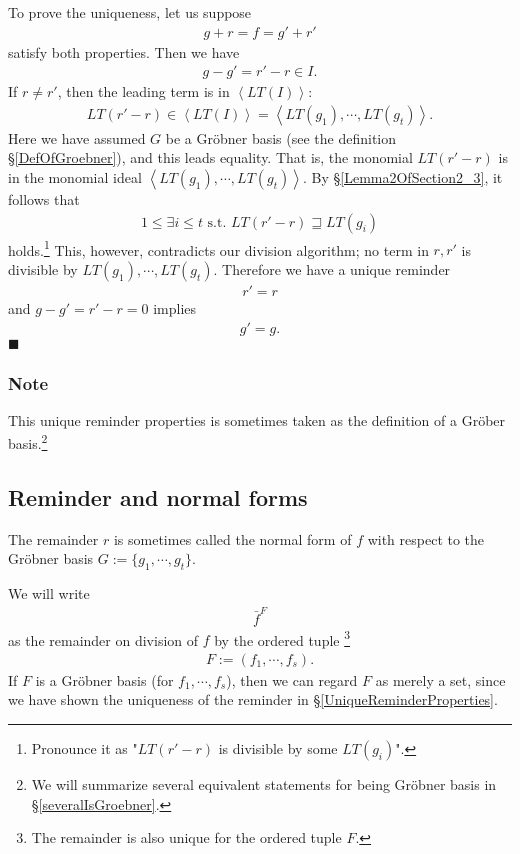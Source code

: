 \documentclass[11pt]{book}
\begin{document}
To prove the uniqueness, let us suppose
\begin{eqnarray}
g + r = f = g' + r'
\end{eqnarray}
satisfy both properties.
Then we have
\begin{eqnarray}
g - g' = r' - r \in I.
\end{eqnarray}
If $r \neq r'$, then the leading term is in $\left< LT(I) \right>$:
\begin{eqnarray}
LT(r' - r) \in \left< LT(I) \right> = \left< LT(g_1), \cdots, LT(g_t) \right>.
\end{eqnarray}
Here we have assumed $G$ be a Gr\"obner basis (see the definition \S\ref{DefOfGroebner}), and this leads equality.
That is, the monomial $LT(r' - r)$ is in the monomial ideal $\left< LT(g_1), \cdots, LT(g_t) \right>$.
By \S\ref{Lemma2OfSection2_3}, it follows that
\begin{eqnarray}
1 \leq \exists i \leq t \text{ s.t. } LT(r' - r ) \sqsupseteq LT(g_i)
\end{eqnarray}
holds.\footnote{Pronounce it as "$LT(r' - r )$ is divisible by some $LT(g_i)$".}
This, however, contradicts our division algorithm; no term in $r, r'$ is divisible by $LT(g_1), \cdots, LT(g_t)$.
Therefore we have a unique reminder
\begin{eqnarray}
r' = r
\end{eqnarray}
and $g - g' = r' - r = 0$ implies
\begin{eqnarray}
g' = g.
\end{eqnarray}
$\blacksquare$

\subsubsection{Note}
This unique reminder properties is sometimes taken as the definition of a Gr\"ober basis.\footnote{We will summarize several equivalent statements for being Gr\"obner basis in \S\ref{severalIsGroebner}.}

\subsection{Reminder and normal forms}
\label{normalForms}
The remainder $r$ is sometimes called the normal form of $f$ with respect to the Gr\"obner basis $G := \{g_1, \cdots, g_t\} $.

We will write
\begin{eqnarray}
\bar{f}^F
\end{eqnarray}
as the remainder on division of $f$ by the ordered tuple \footnote{The remainder is also unique for the ordered tuple $F$.}
\begin{eqnarray}
F := (f_1, \cdots, f_s).
\end{eqnarray}
If $F$ is a Gr\"obner basis (for $f_1, \cdots, f_s$), then we can regard $F$ as merely a set, since we have shown the uniqueness of the reminder in \S\ref{UniqueReminderProperties}.
\end{document}
